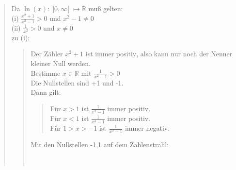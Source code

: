 \begin{quote}
	Da $ \ln(x):\;]0,\infty[\;\longmapsto \mathbb{R}$ muß gelten:\vspace*{2mm}\\
	(i) $ \frac{x^2+1}{x^2-1}> 0 $ und $ x^2-1\neq 0 $ \vspace*{2mm}\\
	(ii) $\frac{1}{x^2}>0$ und $ x\neq 0 $\vspace*{2mm}\\
	zu (i):\\
	\begin{quote}
		Der Zähler $ x^2+1 $ ist immer positiv, also kann nur noch der Nenner kleiner Null werden.\\
		Bestimme $ x\in \mathbb{R} $ mit $ \frac{1}{x^2-1}>0 $\\
		Die Nullstellen sind +1 und -1.\\ Dann gilt:\\
		\begin{quote}
			Für $ x>1 $ ist $ \frac{1}{x^2-1} $  immer positiv.\\
			Für $ x<1 $ ist $ \frac{1}{x^2-1} $  immer positiv.\\
			Für $ 1>x>-1 $ ist $ \frac{1}{x^2-1} $  immer negativ.\\
		\end{quote}
		
		\begin{center}
			Mit den Nullstellen -1,1 auf dem Zahlenstrahl:\\
			\\
		\end{center}
		

\end{quote}
\end{quote}
